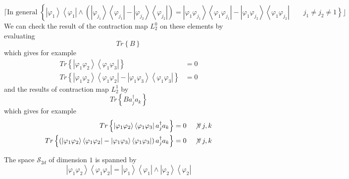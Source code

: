 \documentclass[aps,preprint]{revtex4}%
\begin{document}
\begin{equation}
\mathbf{\lceil}\text{In general }\left\{  \left\vert \varphi_{1}\right\rangle
\left\langle \varphi_{1}\right\vert \wedge\left(  \left\vert \varphi_{j_{1}%
}\right\rangle \left\langle \varphi_{j_{1}}\right\vert -\left\vert
\varphi_{j_{2}}\right\rangle \left\langle \varphi_{j_{2}}\right\vert \right)
\right.  =\left\vert \varphi_{1}\varphi_{j_{1}}\right\rangle \left\langle
\varphi_{1}\varphi_{j_{1}}\right\vert -\left\vert \varphi_{1}\varphi_{j_{2}%
}\right\rangle \left\langle \varphi_{1}\varphi_{j_{2}}\right\vert
\qquad\left.  j_{1}\neq j_{2}\neq1\right\}  \rfloor
\end{equation}
We can check the result of the contraction map $L_{2}^{0}$ on these elements
by evaluating
\begin{equation}
Tr\left\{  B\right\}
\end{equation}
which gives for example
\begin{align*}
Tr\left\{  \left\vert \varphi_{1}\varphi_{2}\right\rangle \left\langle
\varphi_{1}\varphi_{3}\right\vert \right\}   &  =0\\
Tr\left\{  \left\vert \varphi_{1}\varphi_{2}\right\rangle \left\langle
\varphi_{1}\varphi_{2}\right\vert -\left\vert \varphi_{1}\varphi
_{3}\right\rangle \left\langle \varphi_{1}\varphi_{3}\right\vert \right\}   &
=0
\end{align*}
and the results of contraction map $L_{2}^{1}$ by
\begin{equation}
Tr\left\{  Ba_{j}^{\dagger}a_{k}\right\}
\end{equation}
which gives for example%
\begin{align*}
Tr\left\{  \left\vert \varphi_{1}\varphi_{2}\right\rangle \left\langle
\varphi_{1}\varphi_{3}\right\vert a_{j}^{\dagger}a_{k}\right\}   &
=0\quad\not \forall\,j,k\\
Tr\left\{  \left(  \left\vert \varphi_{1}\varphi_{2}\right\rangle \left\langle
\varphi_{1}\varphi_{2}\right\vert -\left\vert \varphi_{1}\varphi
_{3}\right\rangle \left\langle \varphi_{1}\varphi_{3}\right\vert \right)
a_{j}^{\dagger}a_{k}\right\}   &  =0\quad\not \forall\,j,k
\end{align*}


The space $\mathcal{S}_{2d}$ of dimension $1$ is spanned by
\begin{equation}
\left\vert \varphi_{1}\varphi_{2}\right\rangle \left\langle \varphi_{1}%
\varphi_{2}\right\vert =\left\vert \varphi_{1}\right\rangle \left\langle
\varphi_{1}\right\vert \wedge\left\vert \varphi_{2}\right\rangle \left\langle
\varphi_{2}\right\vert
\end{equation}
\end{document}
